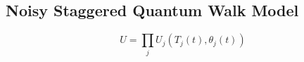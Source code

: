 \documentclass[../../main.tex]{subfiles}
\begin{document}


\subsection{Noisy Staggered Quantum Walk Model}

\begin{equation}
    U = \prod_{j} U_j(T_j(t), \theta_j(t))
\end{equation}
\end{document}
